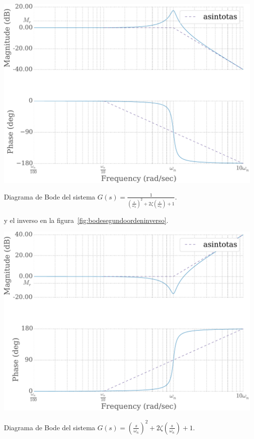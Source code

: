             \begin{marginfigure}
                \centering
                \includegraphics[width=\textwidth]{./imagenes/bodesegundoorden.pdf}
                \caption{\label{fig:bodesegundoorden}Diagrama de Bode del sistema $G(s) = \frac{1}{\left( \frac{s}{\omega_n} \right)^2 + 2 \zeta \left( \frac{s}{\omega_n} \right) + 1}$.}
            \end{marginfigure}

            y el inverso en la figura~\ref{fig:bodesegundoordeninverso}.

            \begin{marginfigure}
                \centering
                \includegraphics[width=\textwidth]{./imagenes/bodesegundoordeninverso.pdf}
                \caption{\label{fig:bodesegundoordeninverso}Diagrama de Bode del sistema $G(s) = \left( \frac{s}{\omega_n} \right)^2 + 2 \zeta \left( \frac{s}{\omega_n} \right) + 1$.}
            \end{marginfigure}

